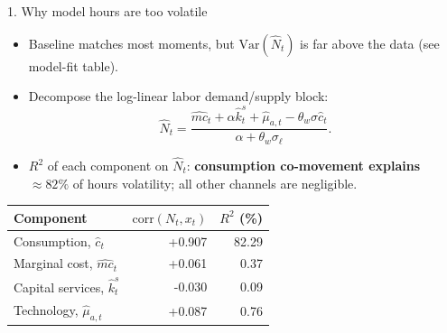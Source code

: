 \documentclass[10pt]{beamer}
\begin{document}
\begin{frame}{1. Why model hours are too volatile}
	\begin{itemize}
		\item Baseline matches most moments, but $\mathrm{Var}(\hat N_t)$ is far above the data (see model-fit table).
		\item Decompose the log-linear labor demand/supply block:
		\[
			\hat N_t = \frac{\hat{mc}_t + \alpha \hat{k}^s_t + \hat{\mu}_{a,t} - \theta_w \sigma \hat{c}_t}{\alpha + \theta_w \sigma_\ell}.
		\]
		\item $R^2$ of each component on $\hat N_t$: \textbf{consumption co-movement explains $\approx 82\%$} of hours volatility; all other channels are negligible.
	\end{itemize}

	\vspace{1em}
	\centering
	\footnotesize
	\begin{tabular}{l r r}
		\hline\hline
		Component & $\mathrm{corr}(N_t,x_t)$ & $R^2$ (\%) \\ 
		\hline
		Consumption, $\hat{c}_t$ & +0.907 & 82.29 \\
		Marginal cost, $\hat{mc}_t$ & +0.061 & 0.37 \\ 
		Capital services, $\hat{k}_t^s$ & -0.030 & 0.09 \\ 
		Technology, $\hat{\mu}_{a, t}$ & +0.087 & 0.76 \\ 
		\hline
	\end{tabular}
\end{frame}
\end{document}
